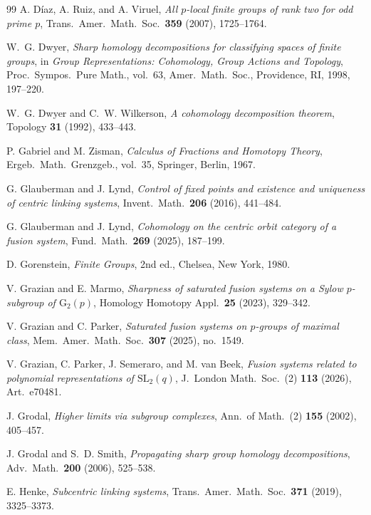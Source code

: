 \documentclass[10pt]{amsart}
\theoremstyle{definition}
\numberwithin{equation}{section}
\begin{document}
\begin{thebibliography}{99}
A. D\'iaz, A. Ruiz, and A. Viruel,
{\it All $p$-local finite groups of rank two for odd prime $p$},
Trans.\ Amer.\ Math.\ Soc.\ \textbf{359} (2007), 1725--1764.

W.~G. Dwyer,
{\it Sharp homology decompositions for classifying spaces of finite groups},
in {\it Group Representations: Cohomology, Group Actions and Topology},
Proc.\ Sympos.\ Pure Math., vol.~63, Amer.\ Math.\ Soc.,
Providence, RI, 1998, 197--220.

W.~G. Dwyer and C.~W. Wilkerson,
{\it A cohomology decomposition theorem},
Topology \textbf{31} (1992), 433--443.

P. Gabriel and M. Zisman,
{\it Calculus of Fractions and Homotopy Theory},
Ergeb.\ Math.\ Grenzgeb., vol.~35, Springer, Berlin, 1967.

G. Glauberman and J. Lynd,
{\it Control of fixed points and existence and uniqueness of centric linking systems},
Invent.\ Math.\ \textbf{206} (2016), 441--484.

G. Glauberman and J. Lynd,
{\it Cohomology on the centric orbit category of a fusion system},
Fund.\ Math.\ \textbf{269} (2025), 187--199.

D. Gorenstein,
{\it Finite Groups}, 2nd ed.,
Chelsea, New York, 1980.

V. Grazian and E. Marmo,
{\it Sharpness of saturated fusion systems on a Sylow $p$-subgroup of
$\mathrm{G}_2(p)$},
Homology Homotopy Appl.\ \textbf{25} (2023), 329--342.

V. Grazian and C. Parker,
{\it Saturated fusion systems on $p$-groups of maximal class},
Mem.\ Amer.\ Math.\ Soc.\ \textbf{307} (2025), no.~1549.

V. Grazian, C. Parker, J. Semeraro, and M. van Beek,
{\it Fusion systems related to polynomial representations of
$\mathrm{SL}_2(q)$},
J.\ London Math.\ Soc.\ (2) \textbf{113} (2026), Art.~e70481.

J. Grodal,
{\it Higher limits via subgroup complexes},
Ann.\ of Math.\ (2) \textbf{155} (2002), 405--457.

J. Grodal and S.~D. Smith,
{\it Propagating sharp group homology decompositions},
Adv.\ Math.\ \textbf{200} (2006), 525--538.

E. Henke,
{\it Subcentric linking systems},
Trans.\ Amer.\ Math.\ Soc.\ \textbf{371} (2019), 3325--3373.


\end{thebibliography}
\end{document}
